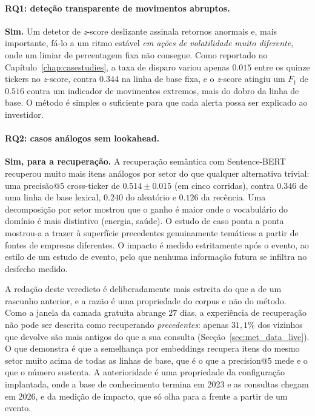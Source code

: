 \paragraph{RQ1: deteção transparente de movimentos abruptos.}
\textbf{Sim.} Um detetor de \emph{z}-score deslizante assinala retornos anormais e, mais importante,
fá-lo a um ritmo estável \emph{em ações de volatilidade muito diferente}, onde um limiar de
percentagem fixa não consegue. Como reportado no
Capítulo~\ref{chap:casestudies}, a taxa de disparo variou apenas $0.015$ entre os quinze tickers no
\emph{z}-score, contra $0.344$ na linha de base fixa, e o \emph{z}-score atingiu um $F_1$ de $0.516$
contra um indicador de movimentos extremos, mais do dobro da linha de base. O método é simples o
suficiente para que cada alerta possa ser explicado ao investidor.

\paragraph{RQ2: casos análogos sem lookahead.}
\textbf{Sim, para a recuperação.} A recuperação semântica com Sentence-BERT recuperou muito mais
itens análogos por setor do que qualquer alternativa trivial: uma precisão@$5$ cross-ticker de
$0.514 \pm 0.015$ (em cinco corridas), contra $0.346$ de uma linha de base lexical, $0.240$ do
aleatório e $0.126$ da recência. Uma decomposição por setor mostrou que o ganho é maior onde o
vocabulário do domínio é mais distintivo (energia, saúde). O estudo de caso ponta a ponta mostrou-a a
trazer à superfície precedentes genuinamente temáticos a partir de fontes de empresas diferentes. O
impacto é medido estritamente após o evento, ao estilo de um estudo de evento, pelo que nenhuma
informação futura se infiltra no desfecho medido.

A redação deste veredicto é deliberadamente mais estreita do que a de um rascunho anterior, e a razão é
uma propriedade do corpus e não do método. Como a janela da camada gratuita abrange $27$ dias, a
experiência de recuperação não pode ser descrita como recuperando \emph{precedentes}: apenas $31,1\%$
dos vizinhos que devolve são mais antigos do que a sua consulta (Secção~\ref{sec:met_data_live}). O que
demonstra é que a semelhança por embeddings recupera itens do mesmo setor muito acima de todas as linhas
de base, que é o que a precision@$5$ mede e o que o número sustenta. A anterioridade é uma propriedade
da configuração implantada, onde a base de conhecimento termina em 2023 e as consultas chegam em 2026, e
da medição de impacto, que só olha para a frente a partir de um evento.

